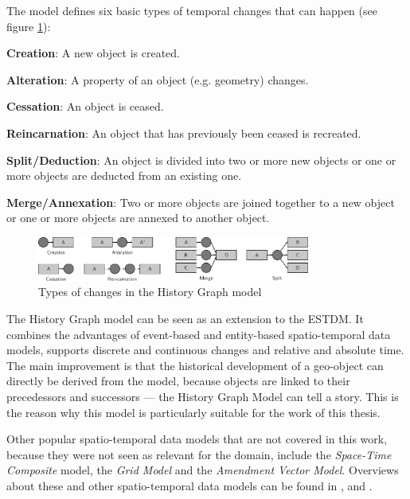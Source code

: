 The model defines six basic types of temporal changes that can happen (see figure \ref{fig:history_graph_changes}):
\begin{compactitem}
  \item \textbf{Creation}:           A new object is created.
  \item \textbf{Alteration}:         A property of an object (e.g. geometry) changes.
  \item \textbf{Cessation}:          An object is ceased.
  \item \textbf{Reincarnation}:      An object that has previously been ceased is recreated.
  \item \textbf{Split/Deduction}:    An object is divided into two or more new objects or one or more objects are deducted from an existing one.
  \item \textbf{Merge/Annexation}:   Two or more objects are joined together to a new object or one or more objects are annexed to another object.
\end{compactitem}

\begin{figure}[ht]
  \centering
  \includegraphics[width=0.8\textwidth]{graphics/basics/stdm/history_graph_changes}
  \caption{Types of changes in the History Graph model}
  \label{fig:history_graph_changes}
\end{figure}

The History Graph model can be seen as an extension to the ESTDM. It combines the advantages of event-based and entity-based spatio-temporal data models, supports discrete and continuous changes and relative and absolute time. The main improvement is that the historical development of a geo-object can directly be derived from the model, because objects are linked to their precedessors and successors --- the History Graph Model can tell a story. This is the reason why this model is particularly suitable for the work of this thesis.


\vspace{1em}
Other popular spatio-temporal data models that are not covered in this work, because they were not seen as relevant for the domain, include the \emph{Space-Time Composite} model, the \emph{Grid Model} and the \emph{Amendment Vector Model}. Overviews about these and other spatio-temporal data models can be found in \cite{zhao11}, \cite{pelekis04stdms} and \cite{peuquet99}.

